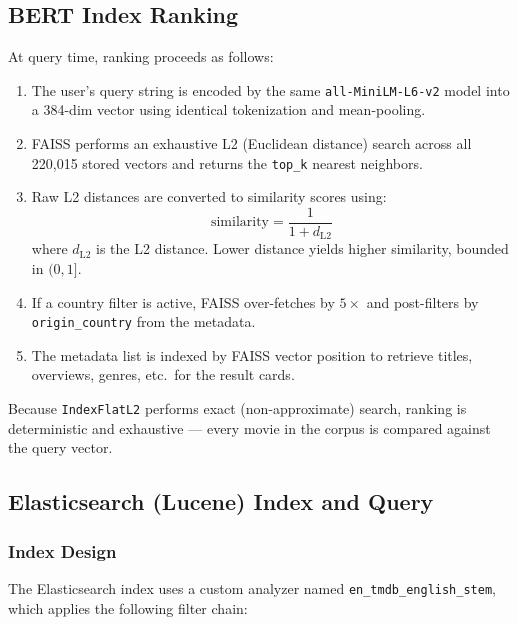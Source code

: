 \documentclass[11pt,a4paper]{article}
\begin{document}
\subsection{BERT Index Ranking}
\label{sec:bert-ranking}

At query time, ranking proceeds as follows:

\begin{enumerate}[nosep]
  \item The user's query string is encoded by the same \texttt{all-MiniLM-L6-v2} model into a 384-dim vector using identical tokenization and mean-pooling.
  \item FAISS performs an exhaustive L2 (Euclidean distance) search across all 220,015 stored vectors and returns the \texttt{top\_k} nearest neighbors.
  \item Raw L2 distances are converted to similarity scores using:
  \[
    \text{similarity} = \frac{1}{1 + d_{\text{L2}}}
  \]
  where $d_{\text{L2}}$ is the L2 distance. Lower distance yields higher similarity, bounded in $(0, 1]$.
  \item If a country filter is active, FAISS over-fetches by $5\times$ and post-filters by \texttt{origin\_country} from the metadata.
  \item The metadata list is indexed by FAISS vector position to retrieve titles, overviews, genres, etc.\ for the result cards.
\end{enumerate}

\noindent Because \texttt{IndexFlatL2} performs exact (non-approximate) search, ranking is deterministic and exhaustive --- every movie in the corpus is compared against the query vector.

\subsection{Elasticsearch (Lucene) Index and Query}
\label{sec:es}

\subsubsection{Index Design}

The Elasticsearch index uses a custom analyzer named \texttt{en\_tmdb\_english\_stem}, which applies the following filter chain:
\end{document}

